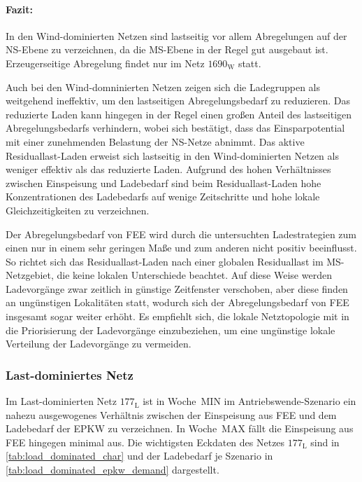 \paragraph{Fazit:}

In den Wind-dominierten Netzen sind lastseitig vor allem Abregelungen auf der \gls{NS}-Ebene zu verzeichnen, da die \gls{MS}-Ebene in der Regel gut ausgebaut ist.
Erzeugerseitige Abregelung findet nur im Netz \(1690_{\text{W}}\) statt.

Auch bei den Wind-domninierten Netzen zeigen sich die Ladegruppen als weitgehend ineffektiv, um den lastseitigen Abregelungsbedarf zu reduzieren.
Das reduzierte Laden kann hingegen in der Regel einen großen Anteil des lastseitigen Abregelungsbedarfs verhindern, wobei sich bestätigt, dass das Einsparpotential mit einer zunehmenden Belastung der \gls{NS}-Netze abnimmt.
Das aktive Residuallast-Laden erweist sich lastseitig in den Wind-dominierten Netzen als weniger effektiv als das reduzierte Laden.
Aufgrund des hohen Verhältnisses zwischen Einspeisung und Ladebedarf sind beim Residuallast-Laden hohe Konzentrationen des Ladebedarfs auf wenige Zeitschritte und hohe lokale Gleichzeitigkeiten zu verzeichnen.

Der Abregelungsbedarf von \gls{FEE} wird durch die untersuchten Ladestrategien zum einen nur in einem sehr geringen Maße und zum anderen nicht positiv beeinflusst.
So richtet sich das Residuallast-Laden nach einer globalen Residuallast im \gls{MS}-Netzgebiet, die keine lokalen Unterschiede beachtet.
Auf diese Weise werden Ladevorgänge zwar zeitlich in günstige Zeitfenster verschoben, aber diese finden an ungünstigen Lokalitäten statt, wodurch sich der Abregelungsbedarf von \gls{FEE} insgesamt sogar weiter erhöht.
Es empfiehlt sich, die lokale Netztopologie mit in die Priorisierung der Ladevorgänge einzubeziehen, um eine ungünstige lokale Verteilung der Ladevorgänge zu vermeiden.


\subsubsection{Last-dominiertes Netz}

Im Last-dominierten Netz \(177_{\text{L}}\) ist in Woche~MIN im Antriebswende-Szenario ein nahezu ausgewogenes Verhältnis zwischen der Einspeisung aus \gls{FEE} und dem Ladebedarf der \gls{EPKW} zu verzeichnen.
In Woche~MAX fällt die Einspeisung aus \gls{FEE} hingegen minimal aus.
Die wichtigsten Eckdaten des Netzes \(177_{\text{L}}\) sind in \autoref{tab:load_dominated_char} und der Ladebedarf je Szenario in \autoref{tab:load_dominated_epkw_demand} dargestellt.

